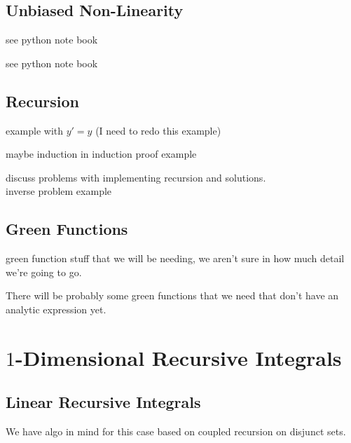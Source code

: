 \documentclass[a4paper,12pt]{article}
\begin{document}
\subsection{Unbiased Non-Linearity}
\begin{example}[$y'=y^{2}$]
    see python note book
\end{example}

\begin{example}[$e^{E[X]}$]
    see python note book
\end{example}

\subsection{Recursion}

\begin{example}
    example with $y'=y$ (I need to redo this example)
\end{example}

\begin{example}
    maybe induction in induction proof example
\end{example}

\begin{example}
    discuss problems with implementing recursion and solutions.  \\
    inverse problem example
\end{example}

\subsection{Green Functions}
green function stuff that we will be needing, we aren't sure in how much detail we're going to go.

\begin{example}
    There will be probably some green functions that we need
    that don't have an analytic expression yet.
\end{example}

\section{$1$-Dimensional Recursive Integrals}

\subsection{Linear Recursive Integrals}
We have algo in mind for this case based on coupled recursion on disjunct sets.
\end{document}
